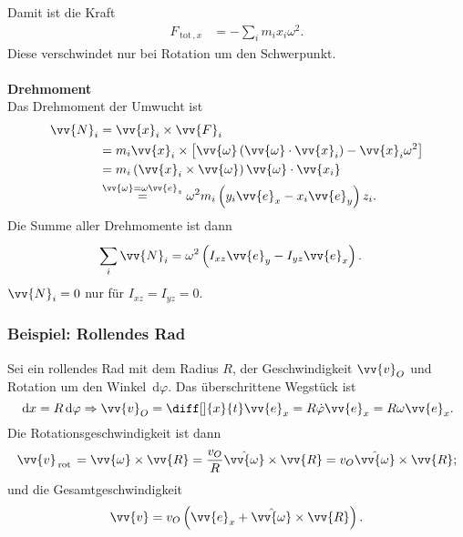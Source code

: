\documentclass[a4paper,12pt]{article}
\newcommand{\td}{\,\text{d}}
\numberwithin{equation}{section}
\begin{document}
Damit ist die Kraft
\begin{align*}
        F_{\,\text{tot}\,,x}&=-\sum_{i}^{}m_ix_i\omega ^2
.\end{align*}
Diese verschwindet nur bei Rotation um den Schwerpunkt.
\\\hfill\\\textbf{Drehmoment}\\ 
Das Drehmoment der Umwucht ist
\begin{align*}
        \vv{N}_i&=\vv{x}_i\times \vv{F}_i\\
                &=m_i\vv{x}_i\times \left[\vv{\omega }\left(\vv{\omega }\cdot \vv{x}_i\right)-\vv{x}_i\omega ^2\right]\\
                &=m_i\left(\vv{x}_i\times \vv{\omega }\right)\vv{\omega }\cdot \vv{x_i}\\
                &\stackrel{\vv{\omega }=\omega \vv{e}_z}{=}\omega ^2m_i\left(y_i\vv{e}_x-x_i\vv{e}_y\right)z_i
.\end{align*}
Die Summe aller Drehmomente ist dann
\begin{align*}
        \sum_{i}^{}\vv{N}_i&=\omega ^2\left(I_{xz}\vv{e}_y-I_{yz}\vv{e}_x\right)
.\end{align*}
$\vv{N}_i=0$ nur für $I_{xz}=I_{yz}=0$.
\subsubsection{Beispiel: Rollendes Rad}
Sei ein rollendes Rad mit dem Radius $R$, der Geschwindigkeit $\vv{v}_O$ und Rotation um den Winkel $\td \varphi $. Das überschrittene Wegstück ist
\[ 
        \td x=R\td \varphi \Rightarrow \vv{v}_O=\diff[]{x}{t}\vv{e}_x=R\dot{\varphi }\vv{e}_x=R\omega \vv{e}_x
.\] 
Die Rotationsgeschwindigkeit ist dann
\[ 
        \vv{v}_{\,\text{rot}\,}=\vv{\omega }\times \vv{R}=\dfrac{v_O}{R}\hat{\vv{\omega }}\times \vv{R}=v_O\hat{\vv{\omega }}\times \vv{R}
;\] 
und die Gesamtgeschwindigkeit
\[ 
        \vv{v}=v_O\left(\vv{e}_x+\hat{\vv{\omega }}\times \vv{R}\right)
.\] 
\end{document}
